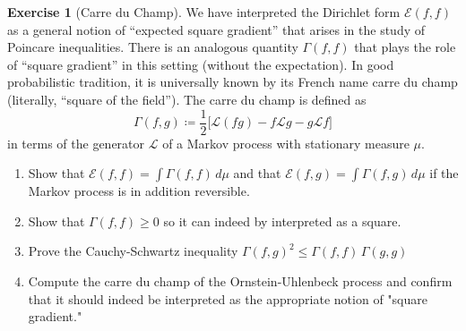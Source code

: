 \documentclass{article}
\theoremstyle{definition}
\newtheorem{exercise}{Exercise}[section]
\theoremstyle{remark}
\theoremstyle{definition}
\begin{document}
\begin{exercise}[Carre du Champ]
We have interpreted the Dirichlet form $\mathcal{E}(f, f)$ as a general notion of “expected square gradient” that arises in the study of Poincare inequalities. There is an analogous quantity $\Gamma(f, f)$ that plays the role of “square gradient” in this setting (without the expectation). In good probabilistic tradition, it is universally known by its French name carre du champ (literally, “square of the field”). The carre du champ is defined as
\[\Gamma(f, g) \coloneqq \frac{1}{2} \big[ \mathscr{L}(f g) - f \mathscr{L} g - g \mathscr{L} f \big] \]
in terms of the generator $\mathscr{L}$ of a Markov process with stationary measure $\mu$. 
\begin{enumerate}
    \item Show that $\mathcal{E}(f, f) = \int \Gamma(f, f) \, d\mu$ and that $\mathcal{E}(f, g) = \int \Gamma(f, g) \,d\mu$ if the Markov process is in addition reversible. 
    \item Show that $\Gamma(f, f) \geq 0$ so it can indeed by interpreted as a square. 
    \item Prove the Cauchy-Schwartz inequality $\Gamma(f, g)^2 \leq \Gamma(f, f) \, \Gamma(g, g)$ 
    \item Compute the carre du champ of the Ornstein-Uhlenbeck process and confirm that it should indeed be interpreted as the appropriate notion of "square gradient." 
\end{enumerate}
\end{exercise}
\end{document}
